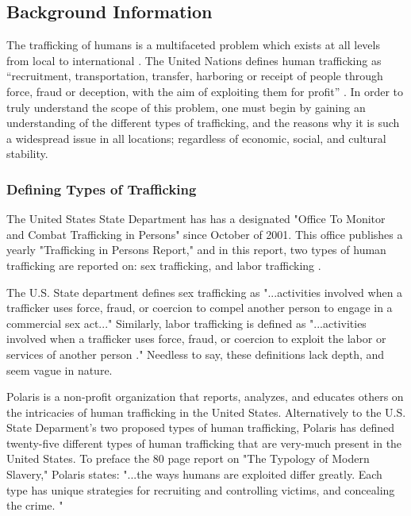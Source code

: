 \documentclass{article} %
\begin{document}
\subsection{Background Information}

The trafficking of humans is a multifaceted problem which exists at all levels from local to international \parencite{Aromaa2007, JacK2012}. The United Nations defines human trafficking as “recruitment, transportation, transfer, harboring or receipt of people through force, fraud or deception, with the aim of exploiting them for profit” \parencite{Raymond2002}. In order to truly understand the scope of this problem, one must begin by gaining an understanding of the different types of trafficking, and the reasons why it is such a widespread issue in all locations; regardless of economic, social, and cultural stability.

\subsubsection*{Defining Types of Trafficking}

The United States State Department has has a designated "Office To Monitor and Combat Trafficking in Persons" since October of 2001. This office publishes a yearly "Trafficking in Persons Report," and in this report, two types of human trafficking are reported on: sex trafficking, and labor trafficking \parencite{StateDept}.

The U.S. State department defines sex trafficking as
"...activities involved when a trafficker uses force, fraud, or coercion to compel another person to engage in a commercial sex act..." Similarly, labor trafficking is defined as "...activities involved when a trafficker uses force, fraud, or coercion to exploit the labor or services of another person \parencite{StateDept}." Needless to say, these definitions lack depth, and seem vague in nature.

Polaris is a non-profit organization that reports, analyzes, and educates others on the intricacies of human trafficking in the United States. Alternatively to the U.S. State Deparment's two proposed types of human trafficking, Polaris has defined twenty-five different types of human trafficking that are very-much present in the United States. To preface the 80 page report on "The Typology of Modern Slavery," Polaris states: "...the ways humans are exploited differ greatly. Each type has unique strategies for recruiting and controlling victims, and concealing the crime. \parencite{polarisTypology}"
\end{document}
